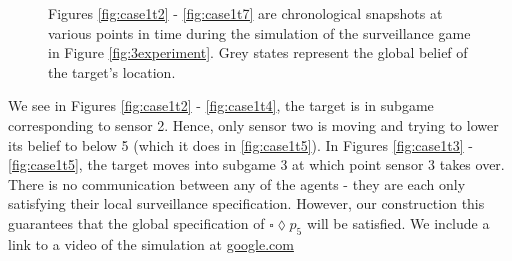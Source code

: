 \begin{figure}
\begin{minipage}{5.0cm}
{		}
		
	\end{minipage}
	
	
	\caption{Figures \ref{fig:case1t2} - \ref{fig:case1t7} are chronological snapshots at various points in time during the simulation of the surveillance game in Figure \ref{fig:3experiment}. Grey states represent the global belief of the target's location.  
	}\vspace{-0.5cm}
	\label{fig:case1exp}
	
\end{figure}

 We see in Figures \ref{fig:case1t2} - \ref{fig:case1t4}, the target is in subgame corresponding to sensor 2. Hence, only sensor two is moving and trying to lower its belief to below 5 (which it does in \ref{fig:case1t5}). In Figures \ref{fig:case1t3} - \ref{fig:case1t5}, the target moves into subgame 3 at which point sensor 3 takes over. There is no communication between any of the agents - they are each only satisfying their local surveillance specification. However, our construction this guarantees that the global specification of $\square \lozenge p_5$ will be satisfied. We include a link to a video of the simulation at \url{google.com}
 
